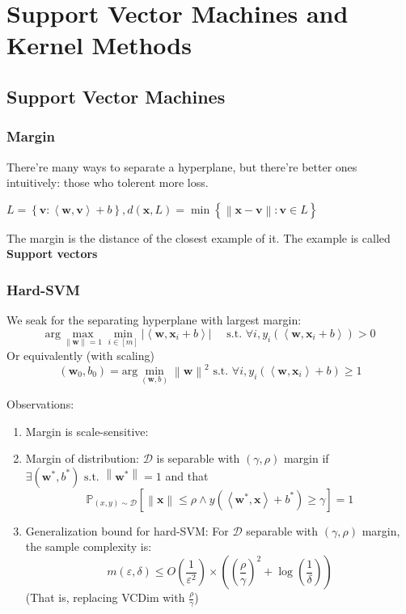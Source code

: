 \documentclass{book}
\newcommand{\D}{\mathcal{D}}
\begin{document}
\chapter{Support Vector Machines and Kernel Methods}
\section{Support Vector Machines}
\subsection{Margin}
There're many ways to separate a hyperplane, but there're better ones intuitively: those who tolerent more loss.

$L=\left\{ \bm{v}: \left\langle \bm{w}, \bm{v} \right\rangle +b\right\}, d(\mathbf{x}, L)= \min \left\{ \left\|\mathbf{x}- \mathbf{v}\right\| : \mathbf{v} \in L \right\} $

The margin is the distance of the closest example of it. The example is called \textbf{Support vectors}

\subsection{Hard-SVM}
We seak for the separating hyperplane with largest margin:
\begin{equation*}
\mathrm{arg}\max_{\left\|\mathbf{w}\right\|=1}\min_{i\in [m]}|\left\langle \mathbf{w}, \mathbf{x}_i +b \right\rangle| \quad \text{ s.t. } \forall i, y_i(\left\langle \mathbf{w},\mathbf{x}_i +b \right\rangle)>0
\end{equation*}
Or equivalently (with scaling)
\begin{equation*}
(\mathbf{w}_0, b_0)= \mathrm{arg}\min_{(\mathbf{w},b)}\left\|\mathbf{w}\right\|^2 \text{ s.t. } \forall i, y_i \left( \left\langle \mathbf{w}, \mathbf{x}_i \right\rangle +b\right)\geq 1
\end{equation*}

Observations: 
\begin{enumerate}
\item Margin is scale-sensitive:
\item Margin of distribution: $\D$ is separable with $(\gamma,\rho)$ margin if $\exists (\mathbf{w}^{*}, b^{*}) \text{ s.t. } \left\|\mathbf{w}^{*}\right\|=1$ and that
  \begin{equation*}
\mathbb{P}_{(x,y)\sim \D}\left[ \left\|\mathbf{x}\right\| \leq \rho \land  y(\left\langle \mathbf{w}^{*}, \mathbf{x} \right\rangle +b^{*})\geq \gamma\right]=1
  \end{equation*}
\item Generalization bound for hard-SVM: For $\D$ separable with $(\gamma, \rho)$ margin, the sample complexity is: 
  \begin{equation*}
m(\varepsilon, \delta)\leq O(\frac{1}{\varepsilon^2})\times ((\frac{\rho}{\gamma})^2+ \log(\frac{1}{\delta}))
\end{equation*}
(That is, replacing VCDim with $\frac{\rho}{\gamma}$)
\end{enumerate}
\end{document}
